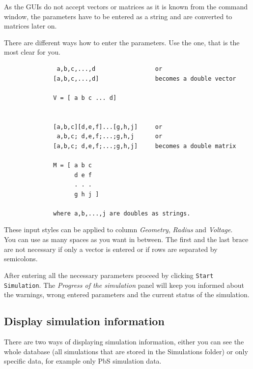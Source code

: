 			\begin{REMARK} 
				As the \matlab \gls{GUI}s do not accept vectors or matrices as it is known from the command window, the parameters
				have to be entered as a string and are converted to matrices later on.
				
				There are different ways how to enter the parameters. Use the one, that is the most clear for you.
				\begin{lstlisting}
               a,b,c,...,d                 or
              [a,b,c,...,d]                becomes a double vector

              V = [ a b c ... d]


              [a,b,c][d,e,f]...[g,h,j]     or
               a,b,c; d,e,f;...;g,h,j      or
              [a,b,c; d,e,f;...;g,h,j]     becomes a double matrix

              M = [ a b c
                    d e f
                    . . .
                    g h j ]

              where a,b,...,j are doubles as strings.
   			\end{lstlisting}
   			These input styles can be applied to column {\it Geometry}, {\it Radius} and {\it Voltage}.	\\
   			You can use as many spaces as you want in between. The first and the last brace are not necessary if only a vector is entered or if
   			rows are separated by semicolons.
			\end{REMARK}
			
			After entering all the necessary parameters proceed by clicking \lstinline{Start Simulation}. The {\it Progress of the simulation} panel will
			keep you informed about the warnings, wrong entered parameters and the current status of the simulation.
			
			\begin{EXAMPLE}	
				
			
			\end{EXAMPLE}



		\subsection{Display simulation information} \label{sec:guiDB}
			There are two ways of displaying simulation information, either you can see the whole database  (all simulations
			that are stored in the Simulations folder) or only specific data, for example only PbS simulation data.
			
